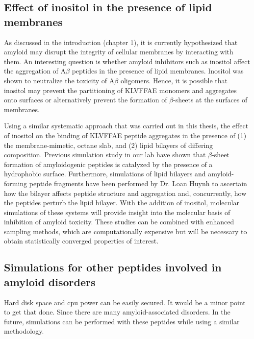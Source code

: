 \subsection{Effect of inositol in the presence of lipid membranes}
As discussed in the introduction (chapter 1), it is currently hypothesized that amyloid may disrupt the integrity of cellular membranes by interacting with them. An interesting question is whether amyloid inhibitors such as inositol affect the aggregation of A$\beta$ peptides in the presence of lipid membranes. Inositol was shown to neutralize the toxicity of A$\beta$ oligomers.\cite{McLaurin:2000bq}  Hence, it is possible that inositol may prevent the partitioning of KLVFFAE monomers and aggregates onto surfaces or alternatively prevent the formation of $\beta$-sheets at the surfaces of membranes.\cite{references}

Using a similar systematic approach that was carried out in this thesis, the effect of inositol on the binding of KLVFFAE peptide aggregates in the presence of (1) the membrane-mimetic, octane slab, and (2) lipid bilayers of differing composition. Previous simulation study in our lab have shown that $\beta$-sheet formation of amyloidogenic peptides is catalyzed by the presence of a hydrophobic surface.\cite{Nikolic:2010go} Furthermore, simulations of lipid bilayers and amyloid-forming peptide fragments have been performed by Dr. Loan Huynh to ascertain how the bilayer affects peptide structure and aggregation and, concurrently, how the peptides perturb the lipid bilayer. With the addition of inositol, molecular simulations of these systems will provide insight into the  molecular basis of inhibition of amyloid toxicity. These studies can be combined with enhanced sampling methods,\cite{TVREX, STDR} which are computationally expensive but will be necessary to obtain statistically converged properties of interest.


\subsection{Simulations for other peptides involved in amyloid disorders}
Hard disk space and cpu power can be easily secured.  It would be a minor point to get that done.  Since there are many amyloid-associated disorders. In the future, simulations can be performed with these peptides while using a similar methodology. 


